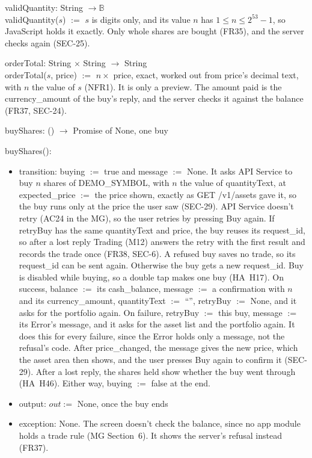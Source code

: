 \documentclass[12pt, titlepage]{article}
\begin{document}
\smallskip
\noindent validQuantity: String $\rightarrow \mathbb{B}$\\
validQuantity($s$) $:=$ $s$ is digits only, and its value $n$ has $1 \leq n
\leq 2^{53} - 1$, so JavaScript holds it exactly. Only whole shares are
bought (FR35), and the server checks again (SEC-25).

\smallskip
\noindent orderTotal: String $\times$ String $\rightarrow$ String\\
orderTotal($s$, price) $:=$ $n \times$ price, exact, worked out from price's
decimal text, with $n$ the value of $s$ (NFR1). It is only a preview. The
amount paid is the currency\_amount of the buy's reply, and the server checks
it against the balance (FR37, SEC-24).

\smallskip
\noindent buyShares: () $\rightarrow$ Promise of None, one buy

\smallskip
\noindent buyShares():
\begin{itemize}
\item transition: buying $:=$ true and message $:=$ None. It asks API Service
  to buy $n$ shares of DEMO\_SYMBOL, with $n$ the value of quantityText, at
  expected\_price $:=$ the price shown, exactly as GET /v1/assets gave it, so
  the buy runs only at the price the user saw (SEC-29). API Service doesn't
  retry (AC24 in the MG), so the user retries by pressing Buy again. If
  retryBuy has the same quantityText and price, the buy reuses its
  request\_id, so after a lost reply Trading (M12) answers the retry with
  the first result and records the trade once (FR38, SEC-6). A refused buy
  saves no trade, so its request\_id can be sent again. Otherwise the buy gets
  a new request\_id.
  Buy is disabled while buying, so a double tap makes one buy (HA~H17). On success, balance $:=$ its cash\_balance, message $:=$
  a confirmation with $n$ and its currency\_amount, quantityText $:=$ ``'',
  retryBuy $:=$ None, and it asks for the portfolio again. On failure,
  retryBuy $:=$ this buy, message $:=$ its Error's message, and it asks for
  the asset list and the portfolio again. It does
  this for every failure, since the Error holds only a message, not the
  refusal's code. After price\_changed, the message gives the new price, which
  the asset area then shows, and the user presses Buy again to confirm it
  (SEC-29). After a lost reply, the shares held show whether the buy went
  through (HA~H46). Either way, buying $:=$ false at the end.
\item output: $out :=$ None, once the buy ends
\item exception: None. The screen doesn't check the balance, since no app
  module holds a trade rule (MG Section~6). It shows the server's refusal
  instead (FR37).
\end{itemize}
\end{document}
